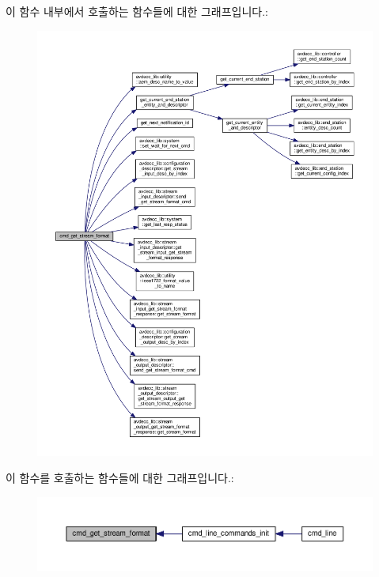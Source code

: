 이 함수 내부에서 호출하는 함수들에 대한 그래프입니다.\+:
\nopagebreak
\begin{figure}[H]
\begin{center}
\leavevmode
\includegraphics[width=350pt]{classcmd__line_a481f4151d6ba2898953c8757298f55ce_cgraph}
\end{center}
\end{figure}




이 함수를 호출하는 함수들에 대한 그래프입니다.\+:
\nopagebreak
\begin{figure}[H]
\begin{center}
\leavevmode
\includegraphics[width=350pt]{classcmd__line_a481f4151d6ba2898953c8757298f55ce_icgraph}
\end{center}
\end{figure}


